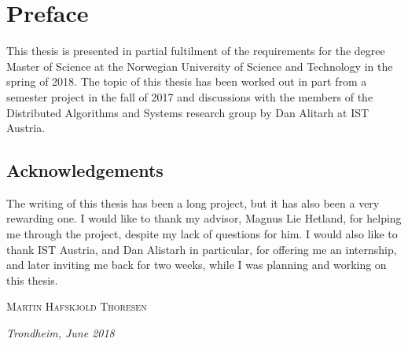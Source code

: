 \par\break\null%
\vsize%
\section*{Preface}

This thesis is presented in partial fultilment of the requirements for the degree Master of Science
at the Norwegian University of Science and Technology in the spring of 2018. The topic of this
thesis has been worked out in part from a semester project in the fall of 2017 and discussions with
the members of the Distributed Algorithms and Systems research group by Dan Alitarh at IST Austria.


\subsection*{Acknowledgements}

The writing of this thesis has been a long project, but it has also been a very rewarding one.  I
would like to thank my advisor, Magnus Lie Hetland, for helping me through the project, despite my
lack of questions for him.  I would also like to thank IST Austria, and Dan Alistarh in particular,
for offering me an internship, and later inviting me back for two weeks, while I was planning and
working on this thesis.

\vfill
\hfill \textsc{Martin Hafskjold Thoresen}

\hfill \textit{Trondheim, June 2018}
\vfill
